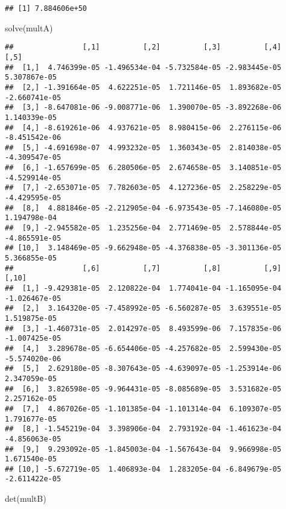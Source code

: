 \documentclass[
]{article}
\newenvironment{Shaded}{\begin{snugshade}}{\end{snugshade}}
\newcommand{\FunctionTok}[1]{\textcolor[rgb]{0.00,0.00,0.00}{#1}}
\newcommand{\NormalTok}[1]{#1}
\begin{document}
\begin{verbatim}
## [1] 7.884606e+50
\end{verbatim}

\begin{Shaded}
\begin{Highlighting}[]
\FunctionTok{solve}\NormalTok{(multA)}
\end{Highlighting}
\end{Shaded}

\begin{verbatim}
##                [,1]          [,2]          [,3]          [,4]          [,5]
##  [1,]  4.746399e-05 -1.496534e-04 -5.732584e-05 -2.983445e-05  5.307867e-05
##  [2,] -1.391664e-05  4.622251e-05  1.721146e-05  1.893682e-05 -2.660741e-05
##  [3,] -8.647081e-06 -9.008771e-06  1.390070e-05 -3.892268e-06  1.140339e-05
##  [4,] -8.619261e-06  4.937621e-05  8.980415e-06  2.276115e-06 -8.451542e-06
##  [5,] -4.691698e-07  4.993232e-05  1.360343e-05  2.814038e-05 -4.309547e-05
##  [6,] -1.657699e-05  6.280506e-05  2.674658e-05  3.140851e-05 -4.529914e-05
##  [7,] -2.653071e-05  7.782603e-05  4.127236e-05  2.258229e-05 -4.429595e-05
##  [8,]  4.881846e-05 -2.212905e-04 -6.973543e-05 -7.146080e-05  1.194798e-04
##  [9,] -2.945582e-05  1.235256e-04  2.771469e-05  2.578844e-05 -4.865591e-05
## [10,]  3.148469e-05 -9.662948e-05 -4.376838e-05 -3.301136e-05  5.366855e-05
##                [,6]          [,7]          [,8]          [,9]         [,10]
##  [1,] -9.429381e-05  2.120822e-04  1.774041e-04 -1.165095e-04 -1.026467e-05
##  [2,]  3.164320e-05 -7.458992e-05 -6.560287e-05  3.639551e-05  1.519875e-05
##  [3,] -1.460731e-05  2.014297e-05  8.493599e-06  7.157835e-06 -1.007425e-05
##  [4,]  3.289678e-05 -6.654406e-05 -4.257682e-05  2.599430e-05 -5.574020e-06
##  [5,]  2.629180e-05 -8.307643e-05 -4.639097e-05 -1.253914e-06  2.347059e-05
##  [6,]  3.826598e-05 -9.964431e-05 -8.085689e-05  3.531682e-05  2.257162e-05
##  [7,]  4.867026e-05 -1.101385e-04 -1.101314e-04  6.109307e-05  1.791677e-05
##  [8,] -1.545219e-04  3.398906e-04  2.793192e-04 -1.461623e-04 -4.856063e-05
##  [9,]  9.293092e-05 -1.845003e-04 -1.567643e-04  9.966998e-05  1.671540e-05
## [10,] -5.672719e-05  1.406893e-04  1.283205e-04 -6.849679e-05 -2.611422e-05
\end{verbatim}

\begin{Shaded}
\begin{Highlighting}[]
\FunctionTok{det}\NormalTok{(multB)}
\end{Highlighting}
\end{Shaded}
\end{document}
